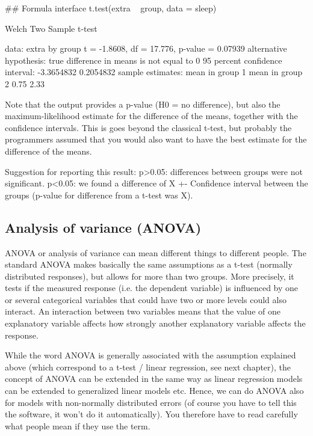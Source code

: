 \documentclass[a4paper,twoside]{tufte-book}\usepackage[]{graphicx}\usepackage[]{color}
\begin{document}
\begin{Schunk}
\begin{Sinput}
## Formula interface
t.test(extra ~ group, data = sleep)
\end{Sinput}
\begin{Soutput}

	Welch Two Sample t-test

data:  extra by group
t = -1.8608, df = 17.776, p-value = 0.07939
alternative hypothesis: true difference in means is not equal to 0
95 percent confidence interval:
 -3.3654832  0.2054832
sample estimates:
mean in group 1 mean in group 2 
           0.75            2.33 
\end{Soutput}
\end{Schunk}

Note that the output provides a p-value (H0 = no difference), but also the maximum-likelihood estimate for the difference of the means, together with the confidence intervals. This is goes beyond the classical t-test, but probably the programmers assumed that you would also want to have the best estimate for the difference of the means.

Suggestion for reporting this result: p>0.05: differences between groups were not significant. p<0.05: we found a difference of X +- Confidence interval between the groups (p-value for difference from a t-test was X). 

\subsection{Analysis of variance (ANOVA)}

ANOVA or analysis of variance can mean different things to different people. The standard ANOVA makes basically the same assumptions as a t-test (normally distributed responses), but allows for more than two groups. More precisely, it tests if the measured response (i.e. the dependent variable) is influenced by one or several categorical variables that could have two or more levels could also interact. An interaction between two variables means that the value of one explanatory variable affects how strongly another explanatory variable affects the response.

While the word ANOVA is generally associated with the assumption explained above (which correspond to a t-test / linear regression, see next chapter), the concept of ANOVA can be extended in the same way as linear regression models can be extended to generalized linear models etc. Hence, we can do ANOVA also for models with non-normally distributed errors (of course you have to tell this the software, it won't do it automatically). You therefore have to read carefully what people mean if they use the term.
\end{document}
